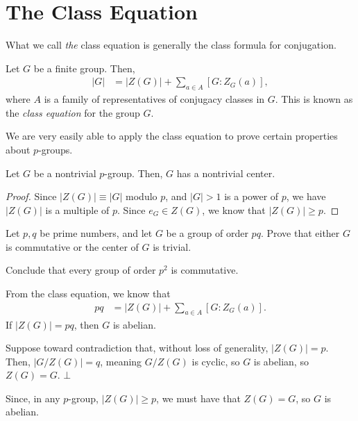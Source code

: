\documentclass[10pt]{mypackage}
\begin{document}
\section{The Class Equation}%
What we call \textsl{the} class equation is generally the class formula for conjugation.
\begin{definition}
  Let $G$ be a finite group. Then,
  \begin{align*}
    \left\vert G \right\vert &= \left\vert Z(G) \right\vert + \sum_{a\in A} \left[ G:Z_G(a) \right],
  \end{align*}
  where $A$ is a family of representatives of conjugacy classes in $G$. This is known as the \textit{class equation} for the group $G$.
\end{definition}
We are very easily able to apply the class equation to prove certain properties about $p$-groups.
\begin{proposition}
  Let $G$ be a nontrivial $p$-group. Then, $G$ has a nontrivial center.
\end{proposition}
\begin{proof}
  Since $\left\vert Z(G) \right\vert \equiv \left\vert G \right\vert$ modulo $p$, and $\left\vert G \right\vert > 1$ is a power of $p$, we have $\left\vert Z(G) \right\vert$ is a multiple of $p$. Since $e_G\in Z(G)$, we know that $\left\vert Z(G) \right\vert \geq p$.
\end{proof}
\begin{exercise}
  Let $p,q$ be prime numbers, and let $G$ be a group of order $pq$. Prove that either $G$ is commutative or the center of $G$ is trivial.\newline

  Conclude that every group of order $p^2$ is commutative.
\end{exercise}
\begin{solution}
  From the class equation, we know that
  \begin{align*}
    pq &= \left\vert Z(G) \right\vert + \sum_{a\in A} \left[ G:Z_G(a) \right].
  \end{align*}
  If $\left\vert Z(G) \right\vert  = pq$, then $G$ is abelian.\newline

  Suppose toward contradiction that, without loss of generality, $\left\vert Z(G) \right\vert = p$. Then, $\left\vert G/Z(G) \right\vert = q$, meaning $G/Z(G)$ is cyclic, so $G$ is abelian, so $Z(G) = G$. $\bot$\newline

  Since, in any $p$-group, $\left\vert Z(G) \right\vert \geq p$, we must have that $Z(G) = G$, so $G$ is abelian.
\end{solution}
\end{document}
